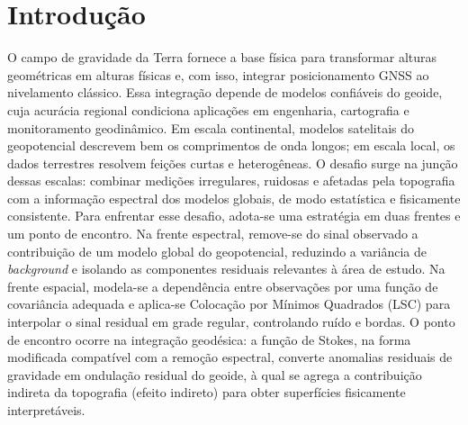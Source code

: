 

\chapter{Introdução}

\vspace{-16pt}

O campo de gravidade da Terra fornece a base física para transformar alturas geométricas em alturas físicas e, com isso, integrar posicionamento GNSS ao nivelamento clássico. Essa integração depende de modelos confiáveis do geoide, cuja acurácia regional condiciona aplicações em engenharia, cartografia e monitoramento geodinâmico. Em escala continental, modelos satelitais do geopotencial descrevem bem os comprimentos de onda longos; em escala local, os dados terrestres resolvem feições curtas e heterogêneas. O desafio surge na junção dessas escalas: combinar medições irregulares, ruidosas e afetadas pela topografia com a informação espectral dos modelos globais, de modo estatística e fisicamente consistente. Para enfrentar esse desafio, adota-se uma estratégia em duas frentes e um ponto de encontro. Na frente espectral, remove-se do sinal observado a contribuição de um modelo global do geopotencial, reduzindo a variância de \emph{background} e isolando as componentes residuais relevantes à área de estudo. Na frente espacial, modela-se a dependência entre observações por uma função de covariância adequada e aplica-se Colocação por Mínimos Quadrados (LSC) para interpolar o sinal residual em grade regular, controlando ruído e bordas. O ponto de encontro ocorre na integração geodésica: a função de Stokes, na forma modificada compatível com a remoção espectral, converte anomalias residuais de gravidade em ondulação residual do geoide, à qual se agrega a contribuição indireta da topografia (efeito indireto) para obter superfícies fisicamente interpretáveis.

